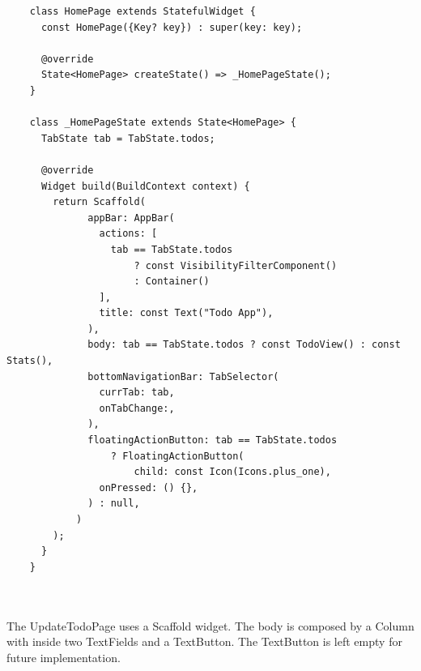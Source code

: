 	 \mbox{}
	\begin{verbatim}
	class HomePage extends StatefulWidget {
	  const HomePage({Key? key}) : super(key: key);
	
	  @override
	  State<HomePage> createState() => _HomePageState();
	}
	
	class _HomePageState extends State<HomePage> {
	  TabState tab = TabState.todos; 
	
	  @override
	  Widget build(BuildContext context) {
	    return Scaffold(
	          appBar: AppBar(
	            actions: [
	              tab == TabState.todos
	                  ? const VisibilityFilterComponent()
	                  : Container()
	            ],
	            title: const Text("Todo App"),
	          ),
	          body: tab == TabState.todos ? const TodoView() : const Stats(),
	          bottomNavigationBar: TabSelector(
	            currTab: tab,
	            onTabChange:,
	          ),
	          floatingActionButton: tab == TabState.todos
	              ? FloatingActionButton(
	                  child: const Icon(Icons.plus_one),
	            onPressed: () {},
	          ) : null,
	        )
	    );
	  }
	}
	
	
	\end{verbatim}
	
	\mbox{}
	
	
	The UpdateTodoPage uses a Scaffold widget. The body is composed by a Column with inside two TextFields and a TextButton. The TextButton is left empty for future implementation.
	
	\mbox{}\\
	
